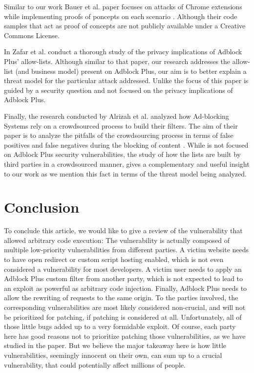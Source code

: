 \documentclass[conference]{IEEEtran}
\begin{document}
Similar to our work Bauer et al. paper focuses on attacks of Chrome extensions while implementing proofs of poncepts on each scenario \cite{bauer2014analyzing}. Although their code samples that act as proof of concepts are not publicly available under a Creative Commons License. 

In \cite{10.1145/3433210.3437536} Zafar et al. conduct a thorough study of the privacy implications of Adblock Plus' allow-lists. Although similar to that paper, our research addresses the allow-list (and business model) present on Adblock Plus, our aim is to better explain a threat model for the particular attack addressed. Unlike \cite{10.1145/3433210.3437536} the focus of this paper is guided by a security question and not focused on the privacy implications of Adblock Plus. 

Finally, the research conducted by Alrizah et al. analyzed how Ad-blocking Systems rely on a crowdsourced process to build their filters. The aim of their paper is to analyze the pitfalls of the crowdsourcing process in terms of false positives and false negatives during the blocking of content \cite{10.1145/3355369.3355588}. While \cite{10.1145/3355369.3355588} is not focused on Adblock Plus security vulnerabilities, the study of how the lists are built by third parties in a crowdsourced manner, gives a complementary and useful insight to our work as we mention this fact in terms of the threat model being analyzed.

\section{Conclusion}
To conclude this article, we would like to give a review of the vulnerability that allowed arbitrary code execution: The vulnerability is actually composed of multiple low-priority vulnerabilities from different parties. A victim website needs to have open redirect or custom script hosting enabled, which is not even considered a vulnerability for most developers. A victim user needs to apply an Adblock Plus custom filter from another party, which is not expected to lead to an exploit as powerful as arbitrary code injection. Finally, Adblock Plus needs to allow the rewriting of requests to the same origin.
To the parties involved, the corresponding vulnerabilities are most likely considered non-crucial, and will not be prioritized for patching, if patching is considered at all. Unfortunately, all of those little bugs added up to a very formidable exploit. Of course, each party here has good reasons not to prioritize patching those vulnerabilities, as we have studied in the paper. But we believe the major takeaway here is how little vulnerabilities, seemingly innocent on their own, can sum up to a crucial vulnerability, that could potentially affect millions of people. 
\end{document}
